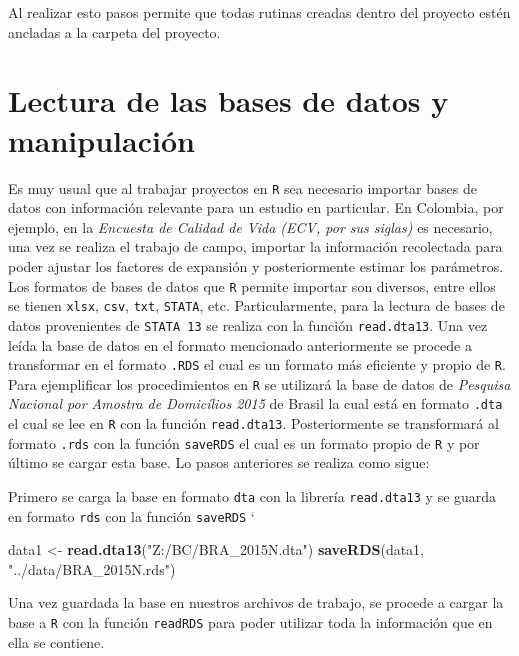 \documentclass[
  12pt,
]{book}
\newenvironment{Shaded}{\begin{snugshade}}{\end{snugshade}}
\newcommand{\FunctionTok}[1]{\textcolor[rgb]{0.13,0.29,0.53}{\textbf{#1}}}
\newcommand{\NormalTok}[1]{#1}
\newcommand{\OtherTok}[1]{\textcolor[rgb]{0.56,0.35,0.01}{#1}}
\newcommand{\StringTok}[1]{\textcolor[rgb]{0.31,0.60,0.02}{#1}}
\begin{document}
Al realizar esto pasos permite que todas rutinas creadas dentro del proyecto estén ancladas a la carpeta del proyecto.

\section{Lectura de las bases de datos y manipulación}\label{lectura-de-las-bases-de-datos-y-manipulaciuxf3n}

Es muy usual que al trabajar proyectos en \texttt{R} sea necesario importar bases de datos con información relevante para un estudio en particular. En Colombia, por ejemplo, en la \emph{Encuesta de Calidad de Vida (ECV, por sus siglas)} es necesario, una vez se realiza el trabajo de campo, importar la información recolectada para poder ajustar los factores de expansión y posteriormente estimar los parámetros. Los formatos de bases de datos que \texttt{R} permite importar son diversos, entre ellos se tienen \texttt{xlsx}, \texttt{csv}, \texttt{txt}, \texttt{STATA}, etc. Particularmente, para la lectura de bases de datos provenientes de \texttt{STATA\ 13} se realiza con la función \texttt{read.dta13}. Una vez leída la base de datos en el formato mencionado anteriormente se procede a transformar en el formato \texttt{.RDS} el cual es un formato más eficiente y propio de \texttt{R}. Para ejemplificar los procedimientos en \texttt{R} se utilizará la base de datos de \emph{Pesquisa Nacional por Amostra de Domicílios 2015 } de Brasil la cual está en formato \texttt{.dta} el cual se lee en \texttt{R} con la función \texttt{read.dta13}. Posteriormente se transformará al formato \texttt{.rds} con la función \texttt{saveRDS} el cual es un formato propio de \texttt{R} y por último se cargar esta base. Lo pasos anteriores se realiza como sigue:

Primero se carga la base en formato \texttt{dta} con la librería \texttt{read.dta13} y se guarda en formato \texttt{rds} con la función \texttt{saveRDS}
`

\begin{Shaded}
\begin{Highlighting}[]
\NormalTok{data1 }\OtherTok{\textless{}{-}} \FunctionTok{read.dta13}\NormalTok{(}\StringTok{"Z:/BC/BRA\_2015N.dta"}\NormalTok{)}
\FunctionTok{saveRDS}\NormalTok{(data1, }\StringTok{"../data/BRA\_2015N.rds"}\NormalTok{) }
\end{Highlighting}
\end{Shaded}

Una vez guardada la base en nuestros archivos de trabajo, se procede a cargar la base a \texttt{R} con la función \texttt{readRDS} para poder utilizar toda la información que en ella se contiene.
\end{document}
